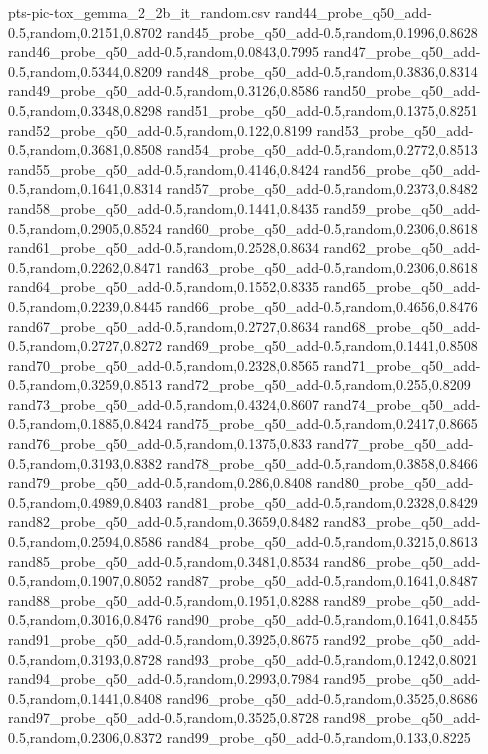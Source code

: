 \begin{filecontents*}[overwrite]{pts-pic-tox_gemma_2_2b_it_random.csv}
rand44_probe_q50_add-0.5,random,0.2151,0.8702
rand45_probe_q50_add-0.5,random,0.1996,0.8628
rand46_probe_q50_add-0.5,random,0.0843,0.7995
rand47_probe_q50_add-0.5,random,0.5344,0.8209
rand48_probe_q50_add-0.5,random,0.3836,0.8314
rand49_probe_q50_add-0.5,random,0.3126,0.8586
rand50_probe_q50_add-0.5,random,0.3348,0.8298
rand51_probe_q50_add-0.5,random,0.1375,0.8251
rand52_probe_q50_add-0.5,random,0.122,0.8199
rand53_probe_q50_add-0.5,random,0.3681,0.8508
rand54_probe_q50_add-0.5,random,0.2772,0.8513
rand55_probe_q50_add-0.5,random,0.4146,0.8424
rand56_probe_q50_add-0.5,random,0.1641,0.8314
rand57_probe_q50_add-0.5,random,0.2373,0.8482
rand58_probe_q50_add-0.5,random,0.1441,0.8435
rand59_probe_q50_add-0.5,random,0.2905,0.8524
rand60_probe_q50_add-0.5,random,0.2306,0.8618
rand61_probe_q50_add-0.5,random,0.2528,0.8634
rand62_probe_q50_add-0.5,random,0.2262,0.8471
rand63_probe_q50_add-0.5,random,0.2306,0.8618
rand64_probe_q50_add-0.5,random,0.1552,0.8335
rand65_probe_q50_add-0.5,random,0.2239,0.8445
rand66_probe_q50_add-0.5,random,0.4656,0.8476
rand67_probe_q50_add-0.5,random,0.2727,0.8634
rand68_probe_q50_add-0.5,random,0.2727,0.8272
rand69_probe_q50_add-0.5,random,0.1441,0.8508
rand70_probe_q50_add-0.5,random,0.2328,0.8565
rand71_probe_q50_add-0.5,random,0.3259,0.8513
rand72_probe_q50_add-0.5,random,0.255,0.8209
rand73_probe_q50_add-0.5,random,0.4324,0.8607
rand74_probe_q50_add-0.5,random,0.1885,0.8424
rand75_probe_q50_add-0.5,random,0.2417,0.8665
rand76_probe_q50_add-0.5,random,0.1375,0.833
rand77_probe_q50_add-0.5,random,0.3193,0.8382
rand78_probe_q50_add-0.5,random,0.3858,0.8466
rand79_probe_q50_add-0.5,random,0.286,0.8408
rand80_probe_q50_add-0.5,random,0.4989,0.8403
rand81_probe_q50_add-0.5,random,0.2328,0.8429
rand82_probe_q50_add-0.5,random,0.3659,0.8482
rand83_probe_q50_add-0.5,random,0.2594,0.8586
rand84_probe_q50_add-0.5,random,0.3215,0.8613
rand85_probe_q50_add-0.5,random,0.3481,0.8534
rand86_probe_q50_add-0.5,random,0.1907,0.8052
rand87_probe_q50_add-0.5,random,0.1641,0.8487
rand88_probe_q50_add-0.5,random,0.1951,0.8288
rand89_probe_q50_add-0.5,random,0.3016,0.8476
rand90_probe_q50_add-0.5,random,0.1641,0.8455
rand91_probe_q50_add-0.5,random,0.3925,0.8675
rand92_probe_q50_add-0.5,random,0.3193,0.8728
rand93_probe_q50_add-0.5,random,0.1242,0.8021
rand94_probe_q50_add-0.5,random,0.2993,0.7984
rand95_probe_q50_add-0.5,random,0.1441,0.8408
rand96_probe_q50_add-0.5,random,0.3525,0.8686
rand97_probe_q50_add-0.5,random,0.3525,0.8728
rand98_probe_q50_add-0.5,random,0.2306,0.8372
rand99_probe_q50_add-0.5,random,0.133,0.8225
\end{filecontents*}
